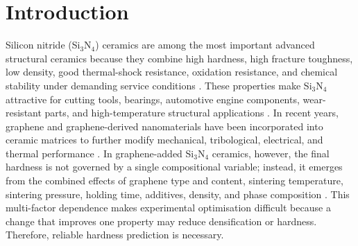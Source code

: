 \documentclass[pdflatex,sn-mathphys-num]{sn-jnl}%
\newif\ifrevmarks%
\newcommand{\revmark}[1]{\ifrevmarks\textcolor{revblue}{#1}\else#1\fi}%
\theoremstyle{thmstyleone}%
\theoremstyle{thmstyletwo}%
\theoremstyle{thmstylethree}%
\begin{document}


\maketitle

\ifrevmarks
\noindent\textcolor{revblue}{\textbf{Note to the reviewer and editor:} all passages modified in this revision are printed in this colour. Text in black is unchanged with respect to the previous version. Rebuilt tables and redrawn figures are indicated by a coloured caption. The accepted, typeset version of the article is produced from the identical source with the mark-up switch turned off, so no colour reaches the published text.}\bigskip
\fi



\section{Introduction}
\revmark{Silicon nitride (Si$_3$N$_4$) ceramics are among the most important advanced structural ceramics because they combine high hardness, high fracture toughness, low density, good thermal-shock resistance, oxidation resistance, and chemical stability under demanding service conditions \cite{petzow2002silicon, klemm2010silicon, riley2000silicon, qadir2018effect, govindasamy2024role}. These properties make Si$_3$N$_4$ attractive for cutting tools, bearings, automotive engine components, wear-resistant parts, and high-temperature structural applications \cite{petzow2002silicon, klemm2010silicon, riley2000silicon, qadir2018effect, govindasamy2024role}. In recent years, graphene and graphene-derived nanomaterials have been incorporated into ceramic matrices to further modify mechanical, tribological, electrical, and thermal performance \cite{zhu2010graphene, soldano2010production, miranzo2017bulk}. In graphene-added Si$_3$N$_4$ ceramics, however, the final hardness is not governed by a single compositional variable; instead, it emerges from the combined effects of graphene type and content, sintering temperature, sintering pressure, holding time, additives, density, and phase composition \cite{qadir2024predicting, balazsi2003preparation, wang2016synthesis, ramirez2014extraordinary, yang2002microstructure, german2009liquid}. This multi-factor dependence makes experimental optimisation difficult because a change that improves one property may reduce densification or hardness. Therefore, reliable hardness prediction is necessary.}
\end{document}
